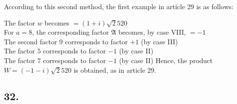 \documentclass[twoside,12pt]{memoir}
\renewenvironment{quote}%
  {\list{}{\leftmargin=5em\rightmargin=0em}\item[]}%
  {\endlist}
\begin{document}
According to this second method, the first example in article 29 is as follows:
\begin{quote}The factor \(w\) becomes \(=(1+i) \surd 2520\)\\
For \(a=8\), the corresponding factor \(\mathfrak{A}\) becomes, by case VIII, \(=-1\)\\
The second factor \(9\) corresponds to factor \(+1\) (by case III)\\
The factor \(5\) corresponds to factor \(-1\) (by case II)\\
The factor \(7\) corresponds to factor \(-1\) (by case II)\end{quote}
Hence, the product \(W=(-1-i) \surd 2520\) is obtained, as in article 29.

\subsection*{32.}
\end{document}
